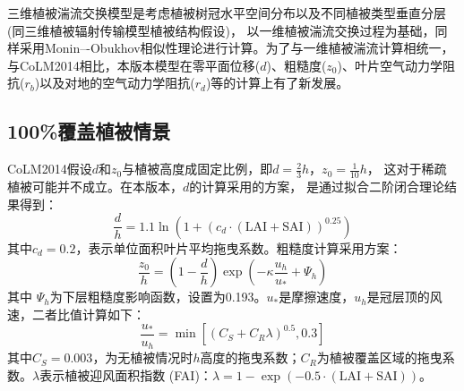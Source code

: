 三维植被湍流交换模型是考虑植被树冠水平空间分布以及不同植被类型垂直分层(同三维植被辐射传输模型植被结构假设)，
以一维植被湍流交换过程为基础，同样采用Monin–-Obukhov相似性理论进行计算。为了与一维植被湍流计算相统一，
与CoLM2014相比，本版本模型在零平面位移($d$)、粗糙度($z_0$)、叶片空气动力学阻抗($r_b$)以及对地的空气动力学阻抗($r_d$)等的计算上有了新发展。


\subsection{100\%覆盖植被情景}
CoLM2014假设$d$和$z_0$与植被高度成固定比例，即$d=\frac{2}{3}h$，$z_0=\frac{1}{10}h$，
这对于稀疏植被可能并不成立\citep{zeng2007consistent}。在本版本，$d$的计算采用\citet{choudhury1988}的方案，
是通过拟合\citet{shaw1982aerodynamic}二阶闭合理论结果得到：
\begin{equation}\label{dOh}
\frac{d}{h}=1.1 \ln \left(1+\left(c_{d} \cdot (\text {LAI} + \text {SAI})\right)^{0.25}\right)
\end{equation}
其中$c_d=0.2$，表示单位面积叶片平均拖曳系数。粗糙度计算采用\citet{raupach1992drag,raupach1994simplified}方案：
\begin{equation}\label{zOh}
\frac{z_{0}}{h}=\left(1-\frac{d}{h}\right) \exp \left(-\kappa \frac{u_{h}}{u_{*}}+\Psi_{h}\right)
\end{equation}
其中%
$\Psi_h$为下层粗糙度影响函数，设置为0.193。$u_\ast$是摩擦速度，$u_h$是冠层顶的风速，二者比值计算如下：
\begin{equation}\label{ustrarOuh}
\frac{u_{*}}{u_{h}}=\min \left[\left(C_{S}+C_{R} \lambda\right)^{0.5}, 0.3\right]
\end{equation}
其中$C_S=0.003$，为无植被情况时$h$高度的拖曳系数；$C_R$为植被覆盖区域的拖曳系数。$\lambda$表示植被迎风面积指数 (FAI)：$\lambda=1-\exp{\left(-0.5 \cdot (\text {LAI}+\text {SAI})\right)}$。


